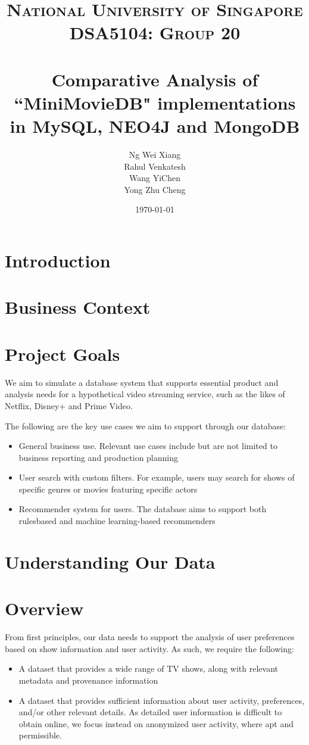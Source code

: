 \documentclass[10pt,titlepage]{article}
\title{
    \textsc{\LARGE National University of Singapore}\\[1cm]
    \textsc{\Large DSA5104: Group 20}\\[2cm]


    \HRule\\[0.4cm]
    \huge{Comparative Analysis of ``MiniMovieDB" implementations in MySQL, NEO4J and MongoDB}
    \HRule\\[1.5cm]
}
\author{\begin{tabular}{rl}
        Ng Wei Xiang & \\
        Rahul Venkatesh & \\
        Wang YiChen & \\
        Yong Zhu Cheng & 
\end{tabular}}
\date{\vfill\today}
\begin{document}
\maketitle
\tableofcontents
\pagebreak

\section{Introduction}
\section{Business Context}
\section{Project Goals}
We aim to simulate a database system that supports essential product and analysis needs for a hypothetical video streaming service, such as the likes of Netflix, Disney+ and Prime Video.

The following are the key use cases we aim to support through our database:

\begin{itemize}
  \item General business use. Relevant use cases include but are not limited to business reporting and production planning

  \item User search with custom filters. For example, users may search for shows of specific genres or movies featuring specific actors

  \item Recommender system for users. The database aims to support both rulesbased and machine learning-based recommenders

\end{itemize}

\section{Understanding Our Data}
\section{Overview}
From first principles, our data needs to support the analysis of user preferences based on show information and user activity. As such, we require the following:

\begin{itemize}
  \item A dataset that provides a wide range of TV shows, along with relevant metadata and provenance information

  \item A dataset that provides sufficient information about user activity, preferences, and/or other relevant details. As detailed user information is difficult to obtain online, we focus instead on anonymized user activity, where apt and permissible.

\end{itemize}
\end{document}
